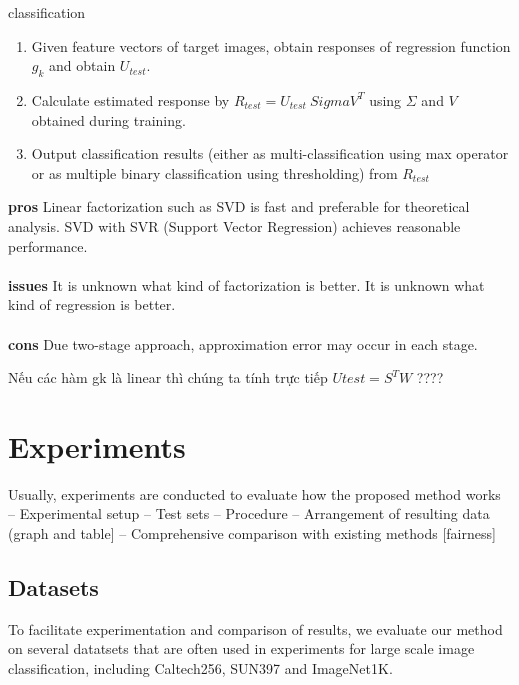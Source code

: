\documentclass[preprint]{elsarticle}
\begin{document}
\begin{algorithm}
  	\caption{classification}\label{alg_classification}
  	\begin{algorithmic}
	\State 
	\begin{enumerate}[Step 1.]
	\item Given feature vectors of target images, obtain responses of regression function $g_k$ and obtain $U_{test}$.

\item Calculate estimated response by $R_{test} = U_{test} \ Sigma V^T$ using $\Sigma$ and $V$ obtained during training.

\item Output classification results (either as multi-classification using max operator or as multiple binary classification using thresholding) from $R_{test}$
\end{enumerate}
	\end{algorithmic}
\end{algorithm}



{\bf pros} Linear factorization such as SVD is fast and preferable for theoretical analysis. SVD with SVR (Support Vector Regression) achieves reasonable performance.\\\\
{\bf issues} It is unknown what kind of factorization is better. It is unknown what kind of regression is better.\\\\
{\bf cons} Due two-stage approach, approximation error may occur in each stage.

Nếu các hàm gk là linear thì chúng ta tính trực tiếp $Utest = S^TW$ ????


\section{Experiments}

Usually, experiments are conducted to evaluate how the proposed method works 
– Experimental setup 
– Test sets
– Procedure
– Arrangement of resulting data (graph and table]
– Comprehensive comparison with existing methods 
[fairness] 

\subsection{Datasets}
To facilitate experimentation and comparison of results, we evaluate our method on several datatsets that are often used in experiments for large scale image classification, including Caltech256, SUN397 and ImageNet1K.
\end{document}
